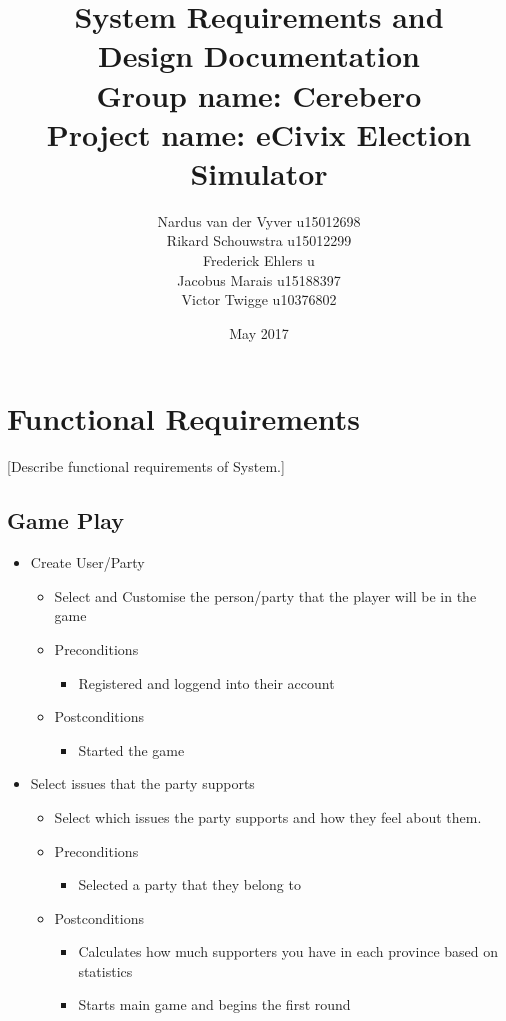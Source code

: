 \documentclass{article}
\title{\textbf{System Requirements and \\Design Documentation}\\
        \textbf{Group name:} Cerebero\\
       \textbf{ Project name:} eCivix Election Simulator}
\date{May 2017}
\author{Nardus van der Vyver u15012698 \\
          Rikard Schouwstra u15012299 \\
          Frederick Ehlers u \\
          Jacobus Marais u15188397 \\
          Victor Twigge u10376802 \\}
\begin{document}
  \maketitle

  \tableofcontents

  \section{Functional Requirements}
  [Describe functional requirements of System.]
   \subsection{Game Play}
   	\begin{itemize}
   		\item Create User/Party
			\begin{itemize}
				\item Select and Customise the person/party that the player will be in the game
				\item Preconditions
				\begin{itemize}
					\item Registered and loggend into their account
				\end{itemize}
				\item Postconditions
				\begin{itemize}
					\item Started the game
				\end{itemize}
			\end{itemize}
	\end{itemize}
	
	\begin{itemize}
   		\item Select issues that the party supports
			\begin{itemize}
				\item Select which issues the party supports and how they feel about them.
				\item Preconditions
				\begin{itemize}
					\item Selected a party that they belong to
				\end{itemize}
				\item Postconditions
				\begin{itemize}
					\item Calculates how much supporters you have in each province based on statistics
					\item Starts main game and begins the first round
				\end{itemize}
			\end{itemize}
	\end{itemize}
	
\end{document}

